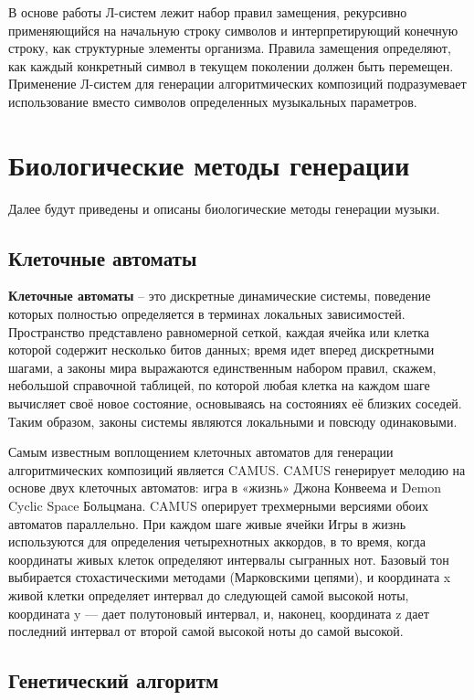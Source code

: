 В основе работы Л-систем лежит набор правил замещения, рекурсивно применяющийся на начальную строку символов и интерпретирующий конечную строку, как структурные элементы организма. Правила замещения определяют, как каждый конкретный символ в текущем поколении должен быть перемещен. Применение Л-систем для генерации алгоритмических композиций подразумевает использование вместо символов определенных музыкальных параметров.


\section{Биологические методы генерации}

Далее будут приведены и описаны биологические методы генерации музыки.

\subsection{Клеточные автоматы}

\textbf{Клеточные автоматы} -- это дискретные динамические системы, поведение которых полностью определяется в терминах локальных зависимостей. Пространство представлено равномерной сеткой, каждая ячейка или клетка которой содержит несколько битов данных; время идет вперед дискретными шагами, а законы мира выражаются единственным набором правил, скажем, небольшой справочной таблицей, по которой любая клетка на каждом шаге вычисляет своё новое состояние, основываясь на состояниях её близких соседей. Таким  образом,  законы  системы  являются  локальными  и повсюду одинаковыми.

Самым известным воплощением клеточных автоматов для генерации алгоритмических композиций является CAMUS. CAMUS генерирует мелодию на основе двух клеточных автоматов: игра в «жизнь» \cite{game-of-life} Джона Конвеема и Demon Cyclic Space Больцмана. CAMUS оперирует трехмерными версиями обоих автоматов параллельно. При каждом шаге живые ячейки Игры в жизнь используются для определения четырехнотных аккордов, в то время, когда координаты живых клеток определяют интервалы сыгранных нот. Базовый тон выбирается стохастическими методами (Марковскими цепями), и координата x живой клетки определяет интервал до следующей самой высокой ноты, координата y — дает полутоновый интервал, и, наконец, координата z дает последний интервал от второй самой высокой ноты до самой высокой.


\subsection{Генетический алгоритм}

